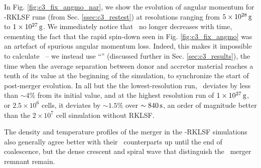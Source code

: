 
In Fig. \ref{fig:c3_fix_angmo_nar}, we show the evolution of angular momentum for \arepo-RKLSF runs (from Sec. \ref{ssec:c3_restest}) at resolutions ranging from $5\times10^{28}\,\mathrm{g}$ to $1\times10^{27}\,\mathrm{g}$.  We immediately notice that \Lzinner\ no longer decreases with time, cementing the fact that the rapid spin-down seen in Fig. \ref{fig:c3_fix_angmo} was an artefact of spurious angular momentum loss.  Indeed, this makes it impossible to calculate \tlm\ -- we instead use ``\tcoal'' (discussed further in Sec. \ref{sec:c3_results}), the time when the average separation between donor and accretor material reaches a tenth of its value at the beginning of the simulation, to synchronize the start of post-merger evolution.  In all but the the lowest-resolution run, \Lztot\ deviates by less than $\sim4$\% from its initial value, and at the highest resolution run of $1\times10^{27}\,\mathrm{g}$, or $2.5\times10^6$ cells, it deviates by $\sim1.5$\% over $\sim840\,\mathrm{s}$, an order of magnitude better than the $2\times10^7$ cell simulation without RKLSF.

The density and temperature profiles of the merger in the \arepo-RKLSF simulations also generally agree better with their \gasoline\ counterparts up until the end of coalescence, but the dense crescent and spiral wave that distinguish the \arepo\ merger remnant remain.

